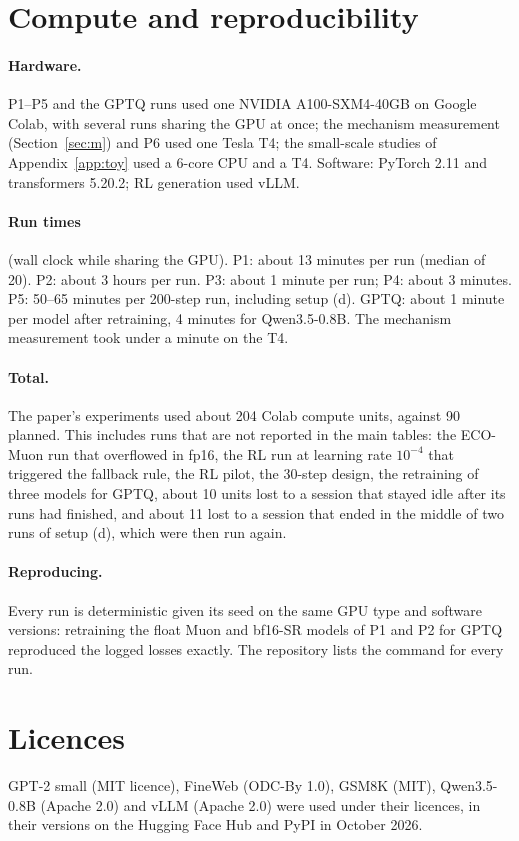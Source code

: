 \documentclass[11pt]{article}
\begin{document}
\FloatBarrier
\section{Compute and reproducibility}\label{app:compute}
\paragraph{Hardware.} P1--P5 and the GPTQ runs used one NVIDIA A100-SXM4-40GB on Google Colab, with several runs
sharing the GPU at once; the mechanism measurement (Section~\ref{sec:m}) and P6 used one Tesla T4; the small-scale
studies of Appendix~\ref{app:toy} used a 6-core CPU and a T4. Software: PyTorch 2.11 and transformers 5.20.2; RL
generation used vLLM.

\paragraph{Run times} (wall clock while sharing the GPU). P1: about 13 minutes per run (median of 20). P2: about 3
hours per run. P3: about 1 minute per run; P4: about 3 minutes. P5: 50--65 minutes per 200-step run, including setup (d). GPTQ: about 1
minute per model after retraining, 4 minutes for Qwen3.5-0.8B. The mechanism measurement took under a minute on the T4.

\paragraph{Total.} The paper's experiments used about 204 Colab compute units, against 90 planned. This includes
runs that are not reported in the main tables: the ECO-Muon run that overflowed in fp16, the RL run at learning rate
$10^{-4}$ that triggered the fallback rule, the RL pilot, the 30-step design, the retraining of three models for GPTQ,
about 10 units lost to a session that stayed idle after its runs had finished, and about 11 lost to a session that
ended in the middle of two runs of setup (d), which were then run again.

\paragraph{Reproducing.} Every run is deterministic given its seed on the same GPU type and software versions:
retraining the float Muon and bf16-SR models of P1 and P2 for GPTQ reproduced the logged losses exactly. The
repository lists the command for every run.

\section{Licences}\label{app:licences}
GPT-2 small (MIT licence), FineWeb (ODC-By 1.0), GSM8K (MIT), Qwen3.5-0.8B (Apache 2.0) and vLLM (Apache 2.0) were
used under their licences, in their versions on the Hugging Face Hub and PyPI in October 2026.
\end{document}
